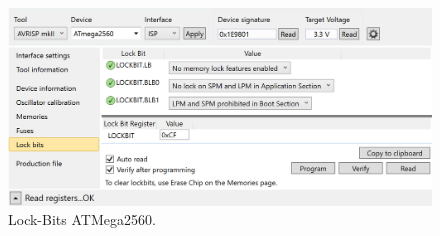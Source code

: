 

\begin{figure}[H]
	\centering
	\includegraphics[width=\textwidth]{graphics/AtmelStudio_Locks}
	\caption{Lock-Bits ATMega2560.}
	\label{fig:AtmelStudio_Locks}
\end{figure}

%
%

